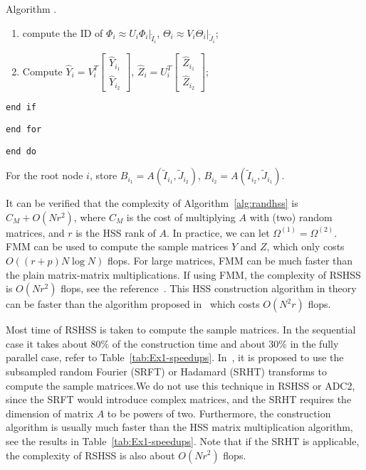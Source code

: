 \documentclass[times]{nlaauth}
\newcounter{algorithm}
\newenvironment{algorithm}{\refstepcounter{algorithm}\vspace{1ex}
  {\sc Algorithm \thealgorithm.}\hspace{0.3em}\parindent=0pt}{\vspace{1ex}}
\begin{document}
\begin{algorithm}
\begin{description}
\begin{enumerate}
        \item compute the ID of  $\Phi_i \approx U_i \Phi_i|_{\tilde{I}_i}$, \quad $\Theta_i \approx V_i \Theta_i|_{\tilde{J}_i}$;

        \item Compute $\widehat{Y}_i = V_i^T \begin{bmatrix} \widehat{Y}_{i_1} \\ \widehat{Y}_{i_2} \end{bmatrix}$,  \quad
                      $\widehat{Z}_i = U_i^T \begin{bmatrix} \widehat{Z}_{i_1} \\ \widehat{Z}_{i_2} \end{bmatrix}$;
       \end{enumerate}


    \item[\qquad] \texttt{end if}

   \item[\quad] \texttt{end for}

\item \texttt{end do}

\end{description}
For the root node $i$, store $B_{i_1} = A(\tilde{I}_{i_1},\tilde{J}_{i_2})$, $B_{i_2} = A(\tilde{I}_{i_2},\tilde{J}_{i_1})$.

\end{algorithm}



It can be verified that the complexity of Algorithm~\ref{alg:randhss} is $C_M+O(N r^2)$, where
$C_M$ is the cost of multiplying $A$ with (two) random matrices, and $r$ is the HSS rank of $A$.
In practice, we can let $\Omega^{(1)}=\Omega^{(2)}$.
FMM can be used to compute the sample matrices $Y$ and $Z$, which only costs $O((r+p)N \log N )$ flops.
For large matrices, FMM can be much faster than the plain matrix-matrix multiplications.
If using FMM, the complexity of RSHSS is $O(N r^2)$ flops,
see the reference~\cite{rand-hss}.
This HSS construction algorithm in theory can be faster than the algorithm proposed in~\cite{Shengguo-SIMAX2} which costs $O(N^2 r)$ flops.


Most time of RSHSS is taken to compute the sample matrices.
In the sequential case it takes about $80\%$ of the construction time and
about $30\%$ in the fully parallel case, refer to Table~\ref{tab:Ex1-speedups}.
In~\cite{Martinsson-Rev10}, it is proposed to use the subsampled random Fourier (SRFT) or Hadamard (SRHT) transforms to compute
the sample matrices.We do not use this technique in RSHSS or ADC2, since the SRFT would introduce complex matrices, and
the SRHT requires the dimension of matrix $A$ to be powers of two.
Furthermore, the construction algorithm is usually much faster than the HSS matrix multiplication algorithm, see the
results in Table~\ref{tab:Ex1-speedups}.
Note that if the SRHT is applicable, the complexity of RSHSS is also about $O(Nr^2)$ flops.
\end{document}

